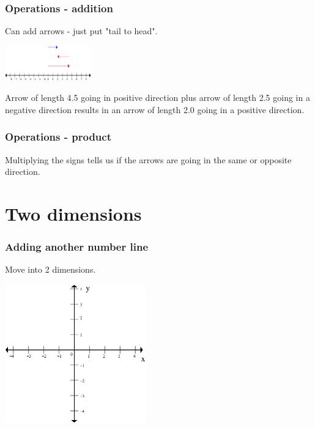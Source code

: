 \documentclass[hyperref={colorlinks=true},xcolor=svgnames]{beamer}
\begin{document}
\begin{frame}
\frametitle{Operations - addition}

Can add arrows - just put "tail to head". 
 
\vskip1cm
\includegraphics[height=1.5cm]{../Figures/1dvectorAddition.png}

Arrow of length 4.5 going in positive direction plus arrow of length 2.5 going in a negative direction results in an arrow of length 2.0 going in a 
positive direction. 

\end{frame}

\begin{frame}
\frametitle{Operations - product}

Multiplying the signs tells us if the arrows are going in the same or opposite direction. 

\end{frame}

\section{Two dimensions}

\begin{frame}
\frametitle{Adding another number line}

Move into 2 dimensions.

\vskip1cm
\begin{center}
\includegraphics[height=6cm]{../Figures/2DGrid.png}
\end{center}

\end{frame}
\end{document}
